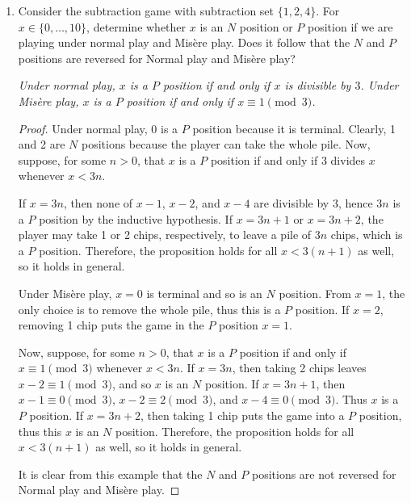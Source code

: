 \documentclass[10pt]{article}
\begin{document}
\begin{enumerate}


\item Consider the subtraction game with subtraction set $\{1,2,4\}$.  For $x \in \{0, \dots , 10 \}$, determine whether $x$ is an $N$ position or $P$ position if we are playing under normal play and Mis\`ere play.  Does it follow that the $N$ and $P$ positions are reversed for Normal play and Mis\`ere play?

\noindent \emph{Under normal play, $x$ is a $P$ position if and only if $x$ is divisible by $3$.  Under Mis\`ere play, $x$ is a $P$ position if and only if $x \equiv 1 \pmod{3}$.}

\begin{proof}
Under normal play, $0$ is a $P$ position because it is terminal.  Clearly, 1 and 2 are $N$ positions because the player can take the whole pile.  Now, suppose, for some $n > 0$, that $x$ is a $P$ position if and only if 3 divides $x$ whenever $x < 3n$.

If $x = 3n$, then none of $x-1$, $x-2$, and $x-4$ are divisible by $3$, hence $3n$ is a $P$ position by the inductive hypothesis.  If $x = 3n + 1$ or $x = 3n+2$, the player may take 1 or 2 chips, respectively, to leave a pile of $3n$ chips, which is a $P$ position.  Therefore, the proposition holds for all $x < 3(n+1)$ as well, so it holds in general.

Under Mis\`ere play, $x=0$ is terminal and so is an $N$ position.  From $x = 1$, the only choice is to remove the whole pile, thus this is a $P$ position.  If $x=2$, removing 1 chip puts the game in the $P$ position $x=1$.

Now, suppose, for some $n>0$, that $x$ is a $P$ position if and only if $x \equiv 1 \pmod{3}$ whenever $x < 3n$.  If $x = 3n$, then taking 2 chips leaves $x-2 \equiv 1 \pmod{3}$, and so $x$ is an $N$ position.  If $x = 3n+1$, then $x-1 \equiv 0 \pmod{3}$, $x-2 \equiv 2 \pmod{3}$,  and $x-4 \equiv 0 \pmod{3}$.  Thus $x$ is a $P$ position.  If $x = 3n+2$, then taking 1 chip puts the game into a $P$ position, thus this $x$ is an $N$ position.  Therefore, the proposition holds for all $x < 3(n+1)$ as well, so it holds in general.

It is clear from this example that the $N$ and $P$ positions are not reversed for Normal play and Mis\`ere play.
\end{proof}



\end{enumerate}
\end{document}
